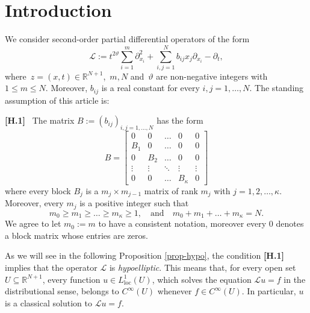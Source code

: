 \documentclass{amsart}
\numberwithin{equation}{section}
\def \R {{\mathbb {R}}}
\def \Lc{{\mathcal{L}}}
\def \r{{\mathbb{R}}}
\begin{document}
\maketitle



\section{Introduction}

We consider second-order partial differential operators of the form
\begin{equation} \label{e-Kolm}
   \Lc 
   := t^{2\vartheta} \sum_{i=1}^m \partial^{2}_{x_i}+\sum_{i,j=1}^N b_{ij}x_j\partial_{x_i}-\partial_t,
\end{equation}
where~$z=(x,t) \in \R^{N+1}$,~$m, N$ and~$\vartheta$ are non-negative integers with $1 \le m \le N$. Moreover, $b_{ij}$ is a real constant for every $i,j=1, \dots, N$. The standing assumption of this article is:

\medskip
\noindent
{\bf[H.1]} \ {The matrix $B:=(b_{ij})_{i,j=1,\ldots,N}$ has the form
   \begin{equation*}
 			   B = 
 			    \begin{bmatrix}
 			       {0} &  {0} & \ldots & {0} & {0}  \\
 			       B_1 & {0} &  \ldots & {0} & {0} \\
                   {0} & B_{2}  & \ldots & {0} & {0} \\
                   \vdots & \vdots  & \ddots & \vdots & \vdots  \\
                   {0} & {0} & \ldots & B_{\kappa} & {0} 
   			 \end{bmatrix}
\end{equation*}
where every block $B_j$ is a $m_{j} \times m_{j-1}$ matrix of rank $m_j$ with $j = 1, 2, \ldots, \kappa$. Moreover, every $m_j$ is a positive integer such that
$$
m_0 \geq m_1 \geq \ldots \geq m_\kappa \geq 1, \quad \textrm{and} \quad m_0+m_1+\ldots+m_\kappa=N.
$$
We agree to let $m_0 := m$ to have a consistent notation, moreover every ${0}$ denotes a block matrix whose entries are zeros.}

\medskip 

As we will see in the following Proposition \ref{prop-hypo}, the condition {\bf[H.1]} implies that the operator $\Lc$ is \textit{hypoelliptic}. This means that, for every open set $U \subseteq \r^{N+1}$, every function $u \in L^1_{\text{loc}}(U)$, which solves the equation $\Lc u = f$ in the distributional sense, belongs to $C^\infty(U)$ whenever $f \in C^\infty(U)$. In particular, $u$ is a classical solution to $\Lc u = f$. 
\vspace{2mm}
\end{document}
